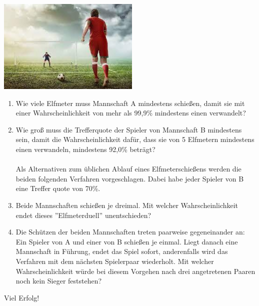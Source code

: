 \documentclass[a4paper,12pt]{article}
\begin{document}
\begin{center}
  {\includegraphics[height=4.5cm]{Q12_1Klausur_Ana_Sto_v2_NachholTermin_01.jpeg}}
\end{center}

\begin{enumerate}[label={\alph*)}] 
  \item Wie viele Elfmeter muss Mannschaft A mindestens schießen, damit sie mit einer Wahrscheinlichkeit von mehr als 99,9\% mindestens einen verwandelt? 
  \item Wie groß muss die Trefferquote der Spieler von Mannschaft B mindestens sein, damit die Wahrscheinlichkeit dafür, dass sie von 5 Elfmetern mindestens einen verwandeln, mindestens 92,0\% beträgt?\\
\\
Als Alternativen zum üblichen Ablauf eines Elfmeterschießens werden die beiden folgenden Verfahren vorgeschlagen. Dabei habe jeder Spieler von B eine Treffer quote von 70\%.

\item Beide Mannschaften schießen je dreimal. Mit welcher Wahrscheinlichkeit endet dieses ''Elfmeterduell'' unentschieden? 
\item Die Schützen der beiden Mannschaften treten paarweise gegeneinander an: Ein Spieler von A und einer von B schießen je einmal. Liegt danach eine Mannschaft in Führung, endet das Spiel sofort, anderenfalls wird das Verfahren mit dem nächsten Spielerpaar wiederholt. Mit welcher Wahrscheinlichkeit würde bei diesem Vorgehen nach drei angetretenen Paaren noch kein Sieger feststehen?
\end{enumerate}

\vspace{3cm}

\begin{center}
  Viel Erfolg!
\end{center}

\end{document}

